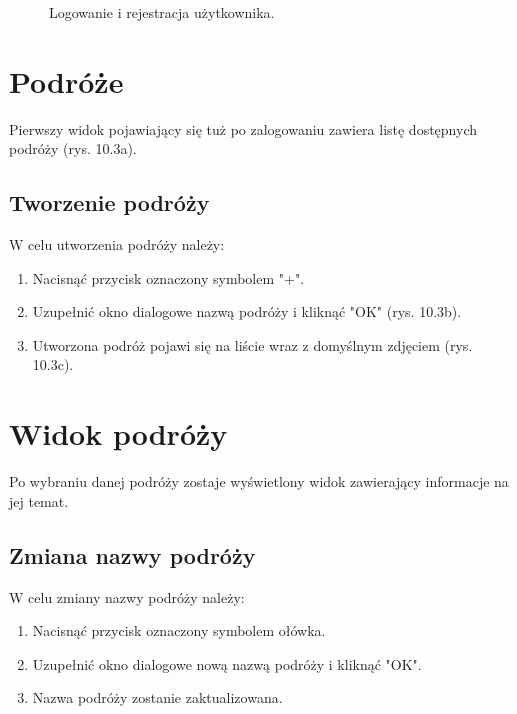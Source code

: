 \begin{figure}[h]

\centering
\null\hfill
{}
\hfill
{}
\hfill\null

\caption{Logowanie i rejestracja użytkownika.}
\label{fig:podrecznik1}
\end{figure}
\FloatBarrier

\section{Podróże}
Pierwszy widok pojawiający się tuż po zalogowaniu zawiera listę dostępnych podróży (rys. 10.3a).

\subsection{Tworzenie podróży}
W celu utworzenia podróży należy:
\begin{enumerate}
\item Nacisnąć przycisk oznaczony symbolem "+".
\item Uzupełnić okno dialogowe nazwą podróży i kliknąć "OK" (rys. 10.3b).
\item Utworzona podróż pojawi się na liście wraz z domyślnym zdjęciem (rys. 10.3c).
\end{enumerate}

\section{Widok podróży}
Po wybraniu danej podróży zostaje wyświetlony widok zawierający informacje na jej temat.

\subsection{Zmiana nazwy podróży}

W celu zmiany nazwy podróży należy:
\begin{enumerate}
\item Nacisnąć przycisk oznaczony symbolem ołówka.
\item Uzupełnić okno dialogowe nową nazwą podróży i kliknąć "OK".
\item Nazwa podróży zostanie zaktualizowana.
\end{enumerate}

